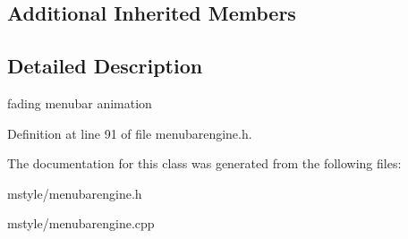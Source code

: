 \subsection*{Additional Inherited Members}


\subsection{Detailed Description}
fading menubar animation 

Definition at line 91 of file menubarengine.\+h.



The documentation for this class was generated from the following files\+:\begin{DoxyCompactItemize}
\item 
mstyle/menubarengine.\+h\item 
mstyle/menubarengine.\+cpp\end{DoxyCompactItemize}
